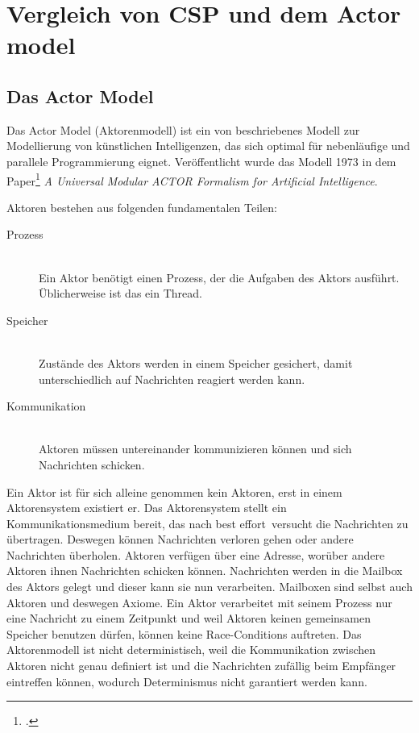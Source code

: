 \section{Vergleich von \acs{CSP} und dem Actor model}

\subsection{Das Actor Model}
Das Actor Model (Aktorenmodell) ist ein von \citeauthor{ACTORS} beschriebenes Modell zur Modellierung von künstlichen Intelligenzen, das sich optimal für nebenläufige und parallele Programmierung eignet. Veröffentlicht wurde das Modell 1973 in dem Paper\footcite{ACTORS} \textit{A Universal Modular ACTOR Formalism for Artificial Intelligence}.

Aktoren bestehen aus folgenden fundamentalen Teilen:

\begin{description}
\item[Prozess]\hfill \\
Ein Aktor benötigt einen Prozess, der die Aufgaben des Aktors ausführt. Üblicherweise ist das ein Thread.
\item[Speicher]\hfill \\
Zustände des Aktors werden in einem Speicher gesichert, damit unterschiedlich auf Nachrichten reagiert werden kann.
\item[Kommunikation] \hfill \\
Aktoren müssen untereinander kommunizieren können und sich Nachrichten schicken.
\end{description}

Ein Aktor ist für sich alleine genommen kein Aktoren, erst in einem Aktorensystem existiert er. Das Aktorensystem stellt ein Kommunikationsmedium bereit, das nach \glqq best effort\grqq\ versucht die Nachrichten zu übertragen. Deswegen können Nachrichten verloren gehen oder andere Nachrichten überholen. Aktoren verfügen über eine Adresse, worüber andere Aktoren ihnen Nachrichten schicken können. Nachrichten werden in die Mailbox des Aktors gelegt und dieser kann sie nun verarbeiten. Mailboxen sind selbst auch Aktoren und deswegen Axiome.
Ein Aktor verarbeitet mit seinem Prozess nur eine Nachricht zu einem Zeitpunkt und weil Aktoren keinen gemeinsamen Speicher benutzen dürfen, können keine Race-Conditions auftreten.
Das Aktorenmodell ist nicht deterministisch, weil die Kommunikation zwischen Aktoren nicht genau definiert ist und die Nachrichten zufällig beim Empfänger eintreffen können, wodurch Determinismus nicht garantiert werden kann.

